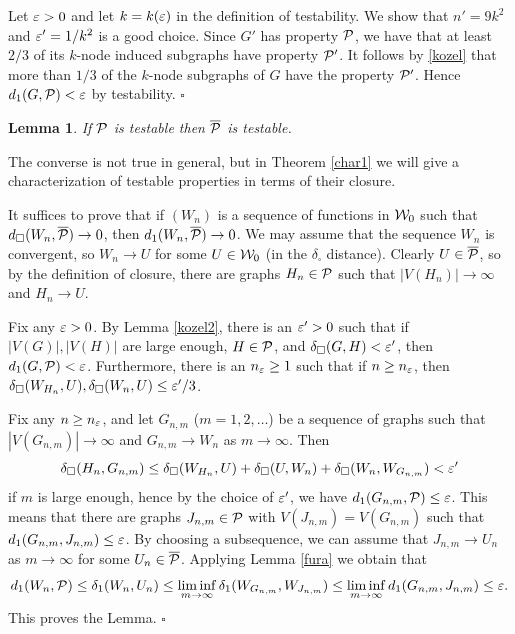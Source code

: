 \documentclass{article}
\newtheorem{lemma}[theorem]{Lemma}
\newenvironment{proof}{\medskip\noindent{\bf Proof. }}{\hfill$\square$\medskip}
\begin{document}
\begin{proof}
Let $\varepsilon>0$ and let $k=k(\varepsilon)$ in the definition of testability. We
show that $n'=9k^2$ and $\varepsilon'=1/k^2$ is a good choice. Since $G'$
has property $\mathcal{P}$, we have that at least $2/3$ of its $k$-node
induced subgraphs have property $\mathcal{P}'$. It follows by \eqref{kozel}
that more than $1/3$ of the $k$-node subgraphs of $G$ have the
property $\mathcal{P}'$. Hence $d_1(G,\mathcal{P})<\varepsilon$ by testability.
\end{proof}

\begin{lemma}\label{P-BARP-TEST}
If $\mathcal{P}$ is testable then $\overline{\mathcal{P}}$ is testable.
\end{lemma}

The converse is not true in general, but in Theorem \ref{char1} we
will give a characterization of testable properties in terms of their
closure.

\begin{proof}
It suffices to prove that if $(W_n)$ is a sequence of functions in
$\mathcal{W}_0$ such that $d_{\square}(W_n,\overline{\mathcal{P}})\to 0$, then
$d_1(W_n,\overline{\mathcal{P}})\to 0$. We may assume that the sequence $W_n$
is convergent, so $W_n\to U$ for some $U\in\mathcal{W}_0$ (in the
$\delta_\square$ distance). Clearly $U\in\overline{\mathcal{P}}$, so by the
definition of closure, there are graphs $H_n\in\mathcal{P}$ such that
$|V(H_n)|\to\infty$ and $H_n\to U$.

Fix any $\varepsilon>0$. By Lemma \ref{kozel2}, there is an $\varepsilon'>0$ such
that if $|V(G)|,|V(H)|$ are large enough, $H\in\mathcal{P}$, and
$\delta_\square(G,H)<\varepsilon'$, then $d_1(G,\mathcal{P})<\varepsilon$. Furthermore,
there is an $n_\varepsilon\ge 1$ such that if $n\ge n_\varepsilon$, then
$\delta_\square(W_{H_n},U),
\delta_\square(W_n,U)\le \varepsilon'/3$.

Fix any $n\ge n_\varepsilon$, and let $G_{n,m}$ ($m=1,2,\dots$) be a
sequence of graphs such that $|V(G_{n,m})|\to\infty$ and $G_{n,m}\to
W_n$ as $m\to\infty$. Then
\[
\delta_\square(H_n,G_{n,m})\le \delta_\square(W_{H_n},U) +
\delta_\square(U,W_n) + \delta_\square(W_n, W_{G_{n,m}})<\varepsilon'
\]
if $m$ is large enough, hence by the choice of $\varepsilon'$, we have
$d_1(G_{n,m},\mathcal{P})\le\varepsilon$. This means that there are graphs
$J_{n,m}\in\mathcal{P}$ with $V(J_{n,m})=V(G_{n,m})$ such that
$d_1(G_{n,m},J_{n,m})\le \varepsilon$. By choosing a subsequence, we can
assume that $J_{n,m}\to U_n$ as $m\to\infty$ for some
$U_n\in\overline{\mathcal{P}}$. Applying Lemma \ref{fura} we obtain that
\[
d_1(W_n,\mathcal{P})\le \delta_1(W_n,U_n)\le \liminf_{m\to\infty}
\delta_1(W_{G_{n,m}},W_{J_{n,m}}) \le \liminf_{m\to\infty}
d_1(G_{n,m},J_{n,m})\le \varepsilon.
\]
This proves the Lemma.
\end{proof}
\end{document}
